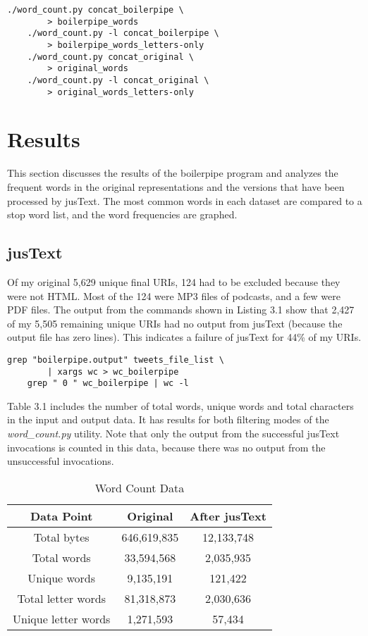 \documentclass[a4paper,12pt]{article}
\begin{document}
\begin{lstlisting}[basicstyle=\ttfamily,caption={Counting words in concatenated data}]
    ./word_count.py concat_boilerpipe \
        > boilerpipe_words
    ./word_count.py -l concat_boilerpipe \
        > boilerpipe_words_letters-only
    ./word_count.py concat_original \
        > original_words
    ./word_count.py -l concat_original \
        > original_words_letters-only
\end{lstlisting}

\section{Results}
This section discusses the results of the boilerpipe program and analyzes the frequent words in the original
representations and the versions that have been processed by jusText. The most common words in each dataset
are compared to a stop word list, and the word frequencies are graphed.

\subsection{jusText}
Of my original 5,629 unique final URIs, 124 had to be excluded because they were not HTML. Most of the 124 were
MP3 files of podcasts, and a few were PDF files. The output from the commands shown in Listing 3.1 show that
2,427 of my 5,505 remaining unique URIs had no output from jusText (because the output file has zero lines).
This indicates a failure of jusText for 44\% of my URIs.

\begin{lstlisting}[basicstyle=\ttfamily,caption={Counting failed jusText runs}]
    grep "boilerpipe.output" tweets_file_list \
        | xargs wc > wc_boilerpipe
    grep " 0 " wc_boilerpipe | wc -l
\end{lstlisting}

Table 3.1 includes the number of total words, unique words and total characters in the input and
output data. It has results for both filtering modes of the \emph{word\_count.py} utility. Note that only the
output from the successful jusText invocations is counted in this data, because there was no output from the
unsuccessful invocations.

\begin{table}[H]
\centering
\caption{Word Count Data}
\begin{tabular}{ | c | c | c | }
\hline
\textbf{Data Point}  & \textbf{Original} & \textbf{After jusText} \\ \hline
Total bytes          & 646,619,835  & 12,133,748    \\ \hline
Total words          & 33,594,568   & 2,035,935     \\ \hline
Unique words         & 9,135,191    & 121,422       \\ \hline
Total letter words   & 81,318,873   & 2,030,636     \\ \hline
Unique letter words  & 1,271,593    & 57,434        \\ \hline
\end{tabular}
\end{table}
\end{document}
